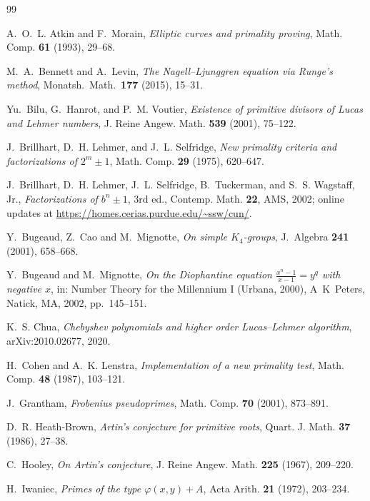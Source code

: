 \documentclass[11pt]{amsart}
\theoremstyle{plain}
\theoremstyle{definition}
\theoremstyle{remark}
\numberwithin{equation}{section}
\begin{document}
\begin{thebibliography}{99}

 A.~O.~L. Atkin and F.~Morain, \emph{Elliptic curves and primality proving}, Math. Comp. \textbf{61} (1993), 29--68.

 M.~A.~Bennett and A.~Levin, \emph{The Nagell--Ljunggren equation via Runge's method}, Monatsh.\ Math.\ \textbf{177} (2015), 15--31.

 Yu.~Bilu, G.~Hanrot, and P.~M. Voutier, \emph{Existence of primitive divisors of Lucas and Lehmer numbers}, J. Reine Angew. Math. \textbf{539} (2001), 75--122.

 J.~Brillhart, D.~H. Lehmer, and J.~L. Selfridge, \emph{New primality criteria and factorizations of $2^m \pm 1$}, Math. Comp. \textbf{29} (1975), 620--647.

 J.~Brillhart, D.~H. Lehmer, J.~L. Selfridge, B.~Tuckerman, and S.~S. Wagstaff, Jr., \emph{Factorizations of $b^n \pm 1$}, 3rd ed., Contemp. Math. \textbf{22}, AMS, 2002; online updates at \url{https://homes.cerias.purdue.edu/~ssw/cun/}.

 Y.~Bugeaud, Z.~Cao and M.~Mignotte, \emph{On simple $K_4$-groups}, J.~Algebra \textbf{241} (2001), 658--668.

 Y.~Bugeaud and M.~Mignotte, \emph{On the Diophantine equation $\frac{x^n-1}{x-1} = y^q$ with negative $x$}, in: Number Theory for the Millennium I (Urbana, 2000), A~K~Peters, Natick, MA, 2002, pp.~145--151.

 K.~S. Chua, \emph{Chebyshev polynomials and higher order Lucas--Lehmer algorithm}, arXiv:2010.02677, 2020.

 H.~Cohen and A.~K. Lenstra, \emph{Implementation of a new primality test}, Math. Comp. \textbf{48} (1987), 103--121.

 J.~Grantham, \emph{Frobenius pseudoprimes}, Math. Comp. \textbf{70} (2001), 873--891.

 D.~R. Heath-Brown, \emph{Artin's conjecture for primitive roots}, Quart. J. Math. \textbf{37} (1986), 27--38.

 C.~Hooley, \emph{On Artin's conjecture}, J. Reine Angew. Math. \textbf{225} (1967), 209--220.

 H.~Iwaniec, \emph{Primes of the type $\varphi(x,y)+A$}, Acta Arith. \textbf{21} (1972), 203--234.


\end{thebibliography}
\end{document}
